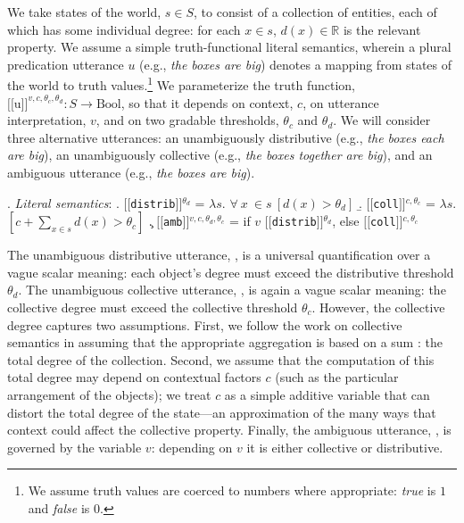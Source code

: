 \documentclass[preprint,12pt,authoryear,titlepage]{elsarticle}
\newcommand{\sem}[1]{\mbox{$[\![$#1$]\!]$}}
\newcommand{\lam}{$\lambda$}
\begin{document}
We take states of the world, $s\in S$, to consist of a collection of entities, each of which has some individual degree: for each $x\in s$, $d(x)\in \mathbb R$ is the relevant property.
We assume a simple truth-functional literal semantics, wherein a plural predication utterance $u$ (e.g., \emph{the boxes are big})  denotes a mapping from states of the world to truth values.\footnote{We assume truth values are coerced to numbers where appropriate: \emph{true} is $1$ and \emph{false} is $0$.} We parameterize the truth function, $\sem{u}^{v,c,\theta_c,\theta_d}: S \rightarrow \text{Bool}$, so that it depends on context, $c$, on utterance interpretation, $v$, and on two gradable thresholds, $\theta_c$ and $\theta_d$. 
We will consider three alternative utterances: 
an {unambiguously distributive} (e.g., \emph{the boxes each are big}), an {unambiguously collective} (e.g., \emph{the boxes together are big}), and an {ambiguous} utterance (e.g., \emph{the boxes are big}).

\ex. \emph{Literal semantics}:
\a. \label{dist}\sem{\texttt{distrib}}$^{\theta_d}$ = 
\lam $s$. $\forall \ x\ \in s\ [d(x) > \theta_d]$
\b. \label{coll}\sem{\texttt{coll}}$^{c,\theta_c}$ = 
\lam $s$. $[c + \sum_{x\in s} d(x) > \theta_c]$
\c.  \label{amb}\sem{\texttt{amb}}$^{v, c, \theta_d, \theta_c}$ = 
if $v$ \sem{\texttt{distrib}}$^{\theta_d}$, else \sem{\texttt{coll}}$^{c,\theta_c}$

The unambiguous distributive utterance, \Last[a], is a universal quantification over a vague scalar meaning: each object's degree must exceed the distributive threshold $\theta_d$. 
The unambiguous collective utterance, \Last[b], is again a vague scalar meaning: the collective degree must exceed the collective threshold $\theta_c$. 
However, the collective degree captures two assumptions. First, we follow the work on collective semantics in assuming that the appropriate aggregation is based on a sum \citep[e.g.,][]{scha1984}: the total degree of the collection.
Second, we assume that the computation of this total degree may depend on contextual factors $c$ (such as the particular arrangement of the objects); we treat $c$ as a simple additive variable that can distort the total degree of the state---an approximation of the many ways that context could affect the collective property. 
Finally, the ambiguous utterance, \Last[c], is governed by the variable $v$: depending on $v$ it is either collective or distributive.
\end{document}
